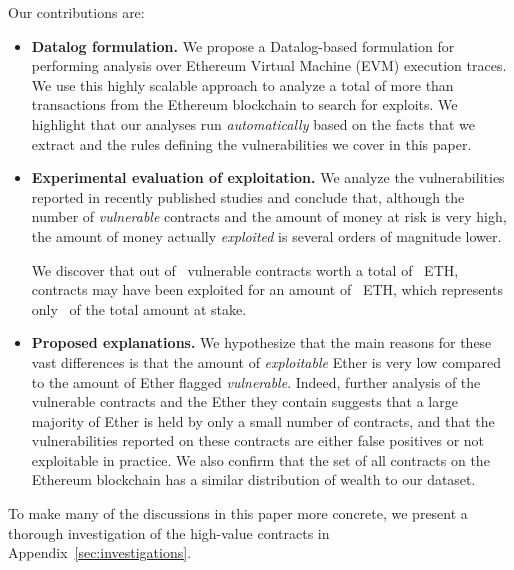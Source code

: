  Our contributions are:\itemsep=0pt
\begin{itemize}\itemsep=-2pt
\item \textbf{Datalog formulation.}
    We propose a Datalog-based formulation for performing analysis over Ethereum Virtual Machine (EVM) execution traces. We use this highly scalable approach to analyze a total of more than~ transactions from the Ethereum blockchain to search for exploits. We highlight that our analyses run \emph{automatically} based on the facts that we extract and the rules defining the vulnerabilities we cover in this paper.

\item \textbf{Experimental evaluation of exploitation.}
    We analyze the vulnerabilities reported in \PapersAnalyzed recently published studies and conclude that, although the number of \emph{vulnerable} contracts and the amount of money at risk is very high, the amount of money actually \emph{exploited} is several orders of magnitude lower.

    We discover that out of~\empirical{\VulnerableContracts} vulnerable contracts worth a total of~\empirical{\EtherStake} ETH,~\empirical{\NumExploitedContracts} contracts may have been exploited for an amount of~\empirical{\ExploitedEther} ETH, which represents only~\empirical{\PercentExploitedEther} of the total amount at stake.

\item \textbf{Proposed explanations.}
    We hypothesize that the main reasons for these vast differences is that the amount of \emph{exploitable} Ether is very low compared to the amount of Ether flagged \emph{vulnerable}.
    Indeed, further analysis of the vulnerable contracts and the Ether they contain suggests that a large majority of Ether is held by only a small number of contracts, and that the vulnerabilities reported on these contracts are either false positives or not exploitable in practice. We also confirm that the set of all contracts on the Ethereum blockchain has a similar distribution of wealth to our dataset.
\end{itemize}
To make many of the discussions in this paper more concrete, we present a thorough investigation of the high-value contracts in Appendix~\ref{sec:investigations}. 


